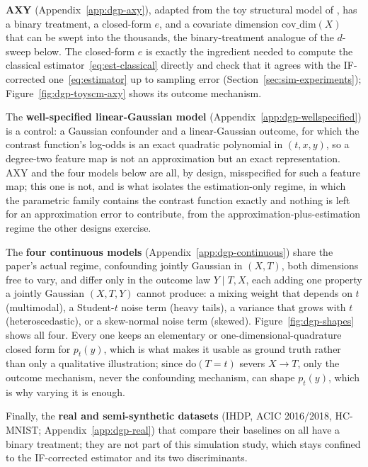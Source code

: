 \documentclass[11pt]{article}
\theoremstyle{plain}
\theoremstyle{definition}
\theoremstyle{remark}
\newcommand{\gps}{e}
\begin{document}
\textbf{AXY} (Appendix~\ref{app:dgp-axy}), adapted from the toy structural model of
\citet{melnychuk2023flows}, has a binary treatment, a closed-form $\gps$, and a covariate
dimension $\mathrm{cov\_dim}(X)$ that can be swept into the thousands, the binary-treatment
analogue of the $d$-sweep below. The closed-form $\gps$ is exactly the ingredient needed to
compute the classical estimator~\eqref{eq:est-classical} directly and check that it agrees with
the IF-corrected one~\eqref{eq:estimator} up to sampling error (Section~\ref{sec:sim-experiments});
Figure~\ref{fig:dgp-toyscm-axy} shows its outcome mechanism.

The \textbf{well-specified linear-Gaussian model} (Appendix~\ref{app:dgp-wellspecified}) is a
control: a Gaussian confounder and a linear-Gaussian outcome, for which the contrast function's
log-odds is an exact quadratic polynomial in $(t,x,y)$, so a degree-two feature map is not an
approximation but an exact representation. AXY and the four models below are all, by design,
misspecified for such a feature map; this one is not, and is what isolates the estimation-only
regime, in which the parametric family contains the contrast function exactly and nothing is
left for an approximation error to contribute, from the approximation-plus-estimation regime
the other designs exercise.

The \textbf{four continuous models} (Appendix~\ref{app:dgp-continuous}) share the paper's actual
regime, confounding jointly Gaussian in $(X,T)$, both dimensions free to vary, and differ
only in the outcome law $Y\mid T,X$, each adding one property a jointly Gaussian $(X,T,Y)$ cannot
produce: a mixing weight that depends on $t$ (multimodal), a Student-$t$ noise term (heavy
tails), a variance that grows with $t$ (heteroscedastic), or a skew-normal noise term (skewed).
Figure~\ref{fig:dgp-shapes} shows all four. Every one keeps an elementary or one-dimensional-quadrature
closed form for $p_t(y)$, which is what makes it usable as ground truth rather than only a
qualitative illustration; since $\mathrm{do}(T=t)$ severs $X\to T$, only the outcome mechanism,
never the confounding mechanism, can shape $p_t(y)$, which is why varying it is enough.

Finally, the \textbf{real and semi-synthetic datasets} (IHDP, ACIC 2016/2018, HC-MNIST;
Appendix~\ref{app:dgp-real}) that \citet{melnychuk2023flows} compare their baselines on all have
a binary treatment; they are not part of this simulation study, which stays confined to the
IF-corrected estimator and its two discriminants.
\end{document}
